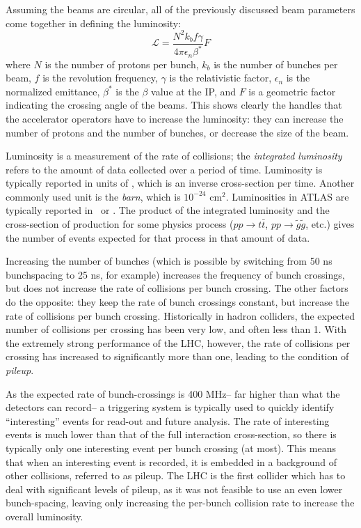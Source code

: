 Assuming the beams are circular, all of the previously discussed beam parameters come together in defining the luminosity:
%
\begin{equation}
\mathcal{L} = \frac{N^2 k_b f \gamma}{4\pi \epsilon_n \beta^*} F
\end{equation}
%
where $N$ is the number of protons per bunch, $k_b$ is the number of bunches per beam, $f$ is the revolution frequency, $\gamma$ is the relativistic factor, $\epsilon_n$ is the normalized emittance, $\beta^*$ is the $\beta$ value at the IP, and $F$ is a geometric factor indicating the crossing angle of the beams. This shows clearly the handles that the accelerator operators have to increase the luminosity: they can increase the number of protons and the number of bunches, or decrease the size of the beam.

Luminosity is a measurement of the rate of collisions; the \textit{integrated luminosity} refers to the amount of data collected over a period of time. Luminosity is typically reported in units of \lumirate, which is an inverse cross-section per time. Another commonly used unit is the \textit{barn}, which is $10^{-24}$ cm$^2$. Luminosities in ATLAS are typically reported in \ipb~or \ifb. The product of the integrated luminosity and the cross-section of production for some physics process ($pp \rightarrow t\bar{t}$, $pp \rightarrow \tilde{g}\tilde{g}$, etc.) gives the number of events expected for that process in that amount of data.

Increasing the number of bunches (which is possible by switching from 50 ns bunchspacing to 25 ns, for example) increases the frequency of bunch crossings, but does not increase the rate of collisions per bunch crossing. The other factors do the opposite: they keep the rate of bunch crossings constant, but increase the rate of collisions per bunch crossing. Historically in hadron colliders, the expected number of collisions per crossing has been very low, and often less than 1. With the extremely strong performance of the LHC, however, the rate of collisions per crossing has increased to significantly more than one, leading to the condition of \textit{pileup}.

As the expected rate of bunch-crossings is 400 MHz-- far higher than what the detectors can record-- a triggering system is typically used to quickly identify ``interesting'' events for read-out and future analysis. The rate of interesting events is much lower than that of the full interaction cross-section, so there is typically only one interesting event per bunch crossing (at most). This means that when an interesting event is recorded, it is embedded in a background of other collisions, referred to as pileup. The LHC is the first collider which has to deal with significant levels of pileup, as it was not feasible to use an even lower bunch-spacing, leaving only increasing the per-bunch collision rate to increase the overall luminosity.

